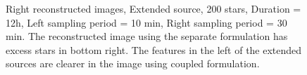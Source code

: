 \begin{enumerate}
\begin{figure}[H]
\hspace{0.4in}
\hspace{0.2in}
\caption [Right reconstructed images , Extended source, 200 stars,  Duration = 12h, Left sampling period = 10 min, Right sampling period = 30 min]{Right  reconstructed images, Extended source, 200 stars,  Duration = 12h, Left sampling period = 10 min, Right sampling period = 30 min. The reconstructed image using the separate formulation has excess stars in bottom right. The features in the left of the extended sources are clearer in the image using coupled formulation.}
\label{fig:expt66}
\end{figure}


\end{enumerate}


